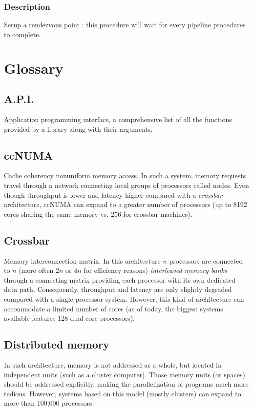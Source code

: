 \documentclass[a4paper,12pt]{article}
\begin{document}
\subsubsection*{Description}
Setup a rendezvous point : this procedure will wait for every pipeline procedures to complete.


%
%


\section{Glossary}

\subsection{A.P.I.}
Application programming interface, a comprehensive list of all the functions provided by a library along with their arguments.

\subsection{ccNUMA}
Cache coherency nonuniform memory access. In such a system, memory requests travel through a network connecting local groups of processors called nodes. Even though throughput is lower and latency higher compared with a \emph{crossbar} architecture, ccNUMA can expand to a greater number of processors (up to 8192 cores sharing the same memory vs. 256 for crossbar machines).

\subsection{Crossbar}
Memory interconnection matrix. In this architecture $n$ processors are connected to $n$ (more often $2n$ or $4n$ for efficiency reasons) \emph{interleaved memory banks} through a connecting matrix providing each processor with its own dedicated data path. Consequently, throughput and latency are only slightly degraded compared with a single processor system. However, this kind of architecture can accommodate a limited number of cores (as of today, the biggest systems available features 128 dual-core processors).

\subsection{Distributed memory}
In such architecture, memory is not addressed as a whole, but located in independent units (such as a cluster computer). Those memory units (or spaces) should be addressed explicitly, making the parallelization of programs much more tedious. However, systems based on this model (mostly clusters) can expand to more than 100,000 processors.
\end{document}
